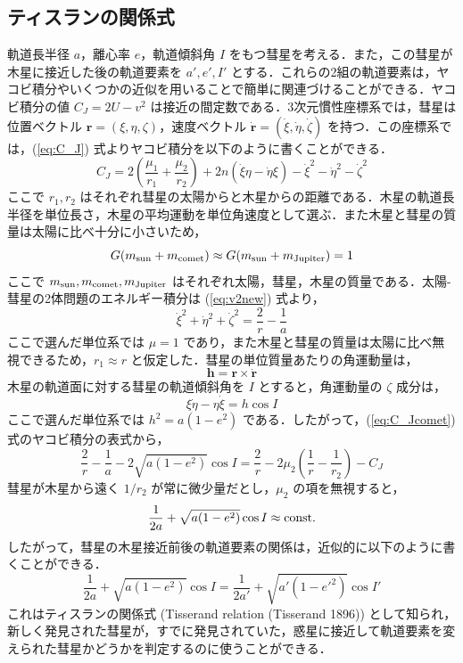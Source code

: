 \documentclass[11pt,a4paper,oneside,onecolumn]{jreport}
\begin{document}
\subsection{ティスランの関係式}
軌道長半径 $a$，離心率 $e$，軌道傾斜角 $I$ をもつ彗星を考える．また，この彗星が木星に接近した後の軌道要素を $a', e', I'$ とする．これらの2組の軌道要素は，ヤコビ積分やいくつかの近似を用いることで簡単に関連づけることができる．ヤコビ積分の値 $C_J = 2 U - v^2$ は接近の間定数である．3次元慣性座標系では，彗星は位置ベクトル ${\bm r} = (\xi, \eta, \zeta)$，速度ベクトル $\dot{{\bm r}} = (\dot{\xi}, \dot{\eta}, \dot{\zeta})$ を持つ．この座標系では，(\ref{eq:C_J}) 式よりヤコビ積分を以下のように書くことができる．
\begin{equation}
C_J = 2 \left( \frac{\mu_1}{r_1} + \frac{\mu_2}{r_2} \right) + 2 n (\dot{\xi} \eta - \dot{\eta} \xi) - \dot{\xi}^2 - \dot{\eta}^2 - \dot{\zeta}^2 \label{eq:C_Jcomet}
\end{equation}
ここで $r_1, r_2$ はそれぞれ彗星の太陽からと木星からの距離である．木星の軌道長半径を単位長さ，木星の平均運動を単位角速度として選ぶ．また木星と彗星の質量は太陽に比べ十分に小さいため，
\begin{equation}
G (m_{\rm sun} + m_{\rm comet}) \approx G (m_{\rm sun} + m_{\rm Jupiter}) = 1
\end{equation}
ここで $m_{\rm sun}, m_{\rm comet}, m_{\rm Jupiter}$ はそれぞれ太陽，彗星，木星の質量である．太陽-彗星の2体問題のエネルギー積分は (\ref{eq:v2new}) 式より，
\begin{equation}
\dot{\xi}^2 + \dot{\eta}^2 + \dot{\zeta}^2 = \frac{2}{r} - \frac{1}{a}
\end{equation}
ここで選んだ単位系では $\mu = 1$ であり，また木星と彗星の質量は太陽に比べ無視できるため，$r_1 \approx r$ と仮定した．彗星の単位質量あたりの角運動量は，
\begin{equation}
{\bm h} = {\bm r} \times \dot{{\bm r}}
\end{equation}
木星の軌道面に対する彗星の軌道傾斜角を $I$ とすると，角運動量の $\zeta$ 成分は，
\begin{equation}
\xi \dot{\eta} - \eta \dot{\xi} = h \cos I
\end{equation}
ここで選んだ単位系では $h^2 = a (1 - e^2)$ である．したがって，(\ref{eq:C_Jcomet}) 式のヤコビ積分の表式から，
\begin{equation}
\frac{2}{r} - \frac{1}{a} - 2 \sqrt{a (1 - e^2)} \cos I = \frac{2}{r} - 2 \mu_2 \left( \frac{1}{r} - \frac{1}{r_2} \right) - C_J
\end{equation}
彗星が木星から遠く $1/r_2$ が常に微少量だとし，$\mu_2$ の項を無視すると，
\begin{equation}
\frac{1}{2a} + \sqrt{a (1 - e^2)} \cos I \approx {\rm const.}
\end{equation}
したがって，彗星の木星接近前後の軌道要素の関係は，近似的に以下のように書くことができる．
\begin{equation}
\frac{1}{2a} + \sqrt{a (1 - e^2)} \cos I = \frac{1}{2a'} + \sqrt{a' (1 - e'^2)} \cos I'
\end{equation}
これはティスランの関係式 (Tisserand relation (Tisserand 1896)) として知られ，新しく発見された彗星が，すでに発見されていた，惑星に接近して軌道要素を変えられた彗星かどうかを判定するのに使うことができる．
\end{document}

